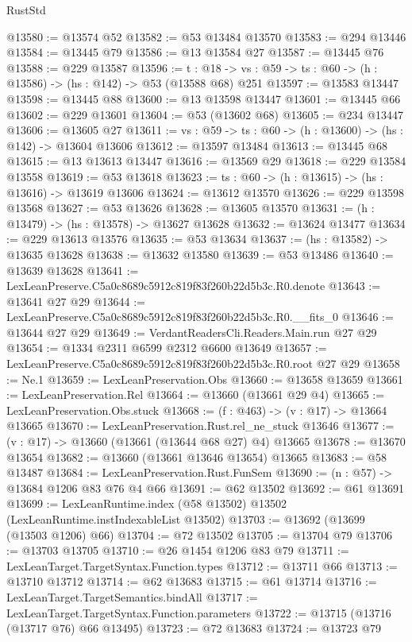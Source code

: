 \begin{lexlean}{RustStd}
\begin{coremodule}
@13580 := @13574 @52
@13582 := @53 @13484 @13570
@13583 := @294 @13446
@13584 := @13445 @79
@13586 := @13 @13584 @27
@13587 := @13445 @76
@13588 := @229 @13587
@13596 := {t : @18} ->
  {vs : @59} -> {ts : @60} -> (h : @13586) -> (hs : @142) -> @53 (@13588 @68) @251
@13597 := @13583 @13447
@13598 := @13445 @88
@13600 := @13 @13598 @13447
@13601 := @13445 @66
@13602 := @229 @13601
@13604 := @53 (@13602 @68)
@13605 := @234 @13447
@13606 := @13605 @27
@13611 := {vs : @59} -> {ts : @60} -> (h : @13600) -> (hs : @142) -> @13604 @13606
@13612 := @13597 @13484
@13613 := @13445 @68
@13615 := @13 @13613 @13447
@13616 := @13569 @29
@13618 := @229 @13584 @13558
@13619 := @53 @13618
@13623 := {ts : @60} -> (h : @13615) -> (hs : @13616) -> @13619 @13606
@13624 := @13612 @13570
@13626 := @229 @13598 @13568
@13627 := @53 @13626
@13628 := @13605 @13570
@13631 := (h : @13479) -> (hs : @13578) -> @13627 @13628
@13632 := @13624 @13477
@13634 := @229 @13613 @13576
@13635 := @53 @13634
@13637 := (hs : @13582) -> @13635 @13628
@13638 := @13632 @13580
@13639 := @53 @13486
@13640 := @13639 @13628
@13641 := LexLeanPreserve.C5a0c8689c5912c819f83f260b22d5b3c.R0.denote
@13643 := @13641 @27 @29
@13644 := LexLeanPreserve.C5a0c8689c5912c819f83f260b22d5b3c.R0.__fits_0
@13646 := @13644 @27 @29
@13649 := VerdantReadersCli.Readers.Main.run @27 @29
@13654 := @1334 @2311 @6599 @2312 @6600 @13649
@13657 := LexLeanPreserve.C5a0c8689c5912c819f83f260b22d5b3c.R0.root @27 @29
@13658 := Ne.{1}
@13659 := LexLeanPreservation.Obs
@13660 := @13658 @13659
@13661 := LexLeanPreservation.Rel
@13664 := @13660 (@13661 @29 @4)
@13665 := LexLeanPreservation.Obs.stuck
@13668 := (f : @463) -> (v : @17) -> @13664 @13665
@13670 := LexLeanPreservation.Rust.rel_ne_stuck @13646
@13677 := (v : @17) -> @13660 (@13661 (@13644 @68 @27) @4) @13665
@13678 := @13670 @13654
@13682 := @13660 (@13661 @13646 @13654) @13665
@13683 := @58 @13487
@13684 := LexLeanPreservation.Rust.FunSem
@13690 := (n : @57) -> @13684 @1206 @83 @76 @4 @66
@13691 := @62 @13502
@13692 := @61 @13691
@13699 := LexLeanRuntime.index (@58 @13502) @13502 (LexLeanRuntime.instIndexableList @13502)
@13703 := @13692 (@13699 (@13503 @1206) @66)
@13704 := @72 @13502
@13705 := @13704 @79
@13706 := @13703 @13705
@13710 := @26 @1454 @1206 @83 @79
@13711 := LexLeanTarget.TargetSyntax.Function.types
@13712 := @13711 @66
@13713 := @13710 @13712
@13714 := @62 @13683
@13715 := @61 @13714
@13716 := LexLeanTarget.TargetSemantics.bindAll
@13717 := LexLeanTarget.TargetSyntax.Function.parameters
@13722 := @13715 (@13716 (@13717 @76) @66 @13495)
@13723 := @72 @13683
@13724 := @13723 @79

\end{coremodule}
\end{lexlean}
